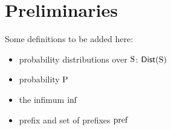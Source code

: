 \section{Preliminaries}
\label{sec:preliminaries}

Some definitions to be added here:

\begin{itemize}
    \item probability distributions over $\S$: $\dist(\S)$
    \item probability $\probability$ 
    \item the infimum $\infim$ 
    \item prefix and set of prefixes $\pref$
\end{itemize}